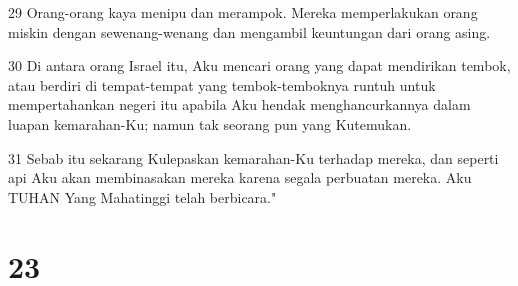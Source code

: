 \par 29 Orang-orang kaya menipu dan merampok. Mereka memperlakukan orang miskin dengan sewenang-wenang dan mengambil keuntungan dari orang asing.
\par 30 Di antara orang Israel itu, Aku mencari orang yang dapat mendirikan tembok, atau berdiri di tempat-tempat yang tembok-temboknya runtuh untuk mempertahankan negeri itu apabila Aku hendak menghancurkannya dalam luapan kemarahan-Ku; namun tak seorang pun yang Kutemukan.
\par 31 Sebab itu sekarang Kulepaskan kemarahan-Ku terhadap mereka, dan seperti api Aku akan membinasakan mereka karena segala perbuatan mereka. Aku TUHAN Yang Mahatinggi telah berbicara."

\chapter{23}


